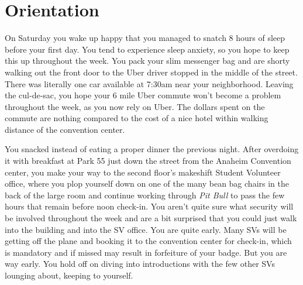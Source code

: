 \documentclass[../main.tex]{subfiles}
\begin{document}
\section{Orientation}

On Saturday you wake up happy that you managed to snatch 8 hours of sleep before your first day. You tend to experience sleep anxiety, so you hope to keep this up throughout the week. You pack your slim messenger bag and are shorty walking out the front door to the Uber driver stopped in the middle of the street. There was literally one car available at 7:30am near your neighborhood. Leaving the cul-de-sac, you hope your 6 mile Uber commute won't become a problem throughout the week, as you now rely on Uber. The dollars spent on the commute are nothing compared to the cost of a nice hotel within walking distance of the convention center.

You snacked instead of eating a proper dinner the previous night. After overdoing it with breakfast at Park 55 just down the street from the Anaheim Convention center, you make your way to the second floor's makeshift Student Volunteer office, where you plop yourself down on one of the many bean bag chairs in the back of the large room and continue working through \textit{Pit Bull} to pass the few hours that remain before noon check-in. You aren't quite sure what security will be involved throughout the week and are a bit surprised that you could just walk into the building and into the SV office. You are quite early. Many SVs will be getting off the plane and booking it to the convention center for check-in, which is mandatory and if missed may result in forfeiture of your badge. But you are way early. You hold off on diving into introductions with the few other SVs lounging about, keeping to yourself.
\end{document}
